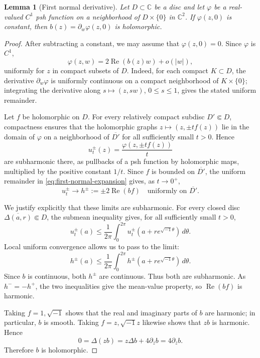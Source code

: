 \documentclass[11pt]{amsart}
\newtheorem{lemma}[theorem]{Lemma}
\theoremstyle{definition}
\theoremstyle{remark}
\numberwithin{equation}{section}
\newcommand{\C}{\mathbb C}
\begin{document}
\begin{lemma}[First normal derivative]\label{lem:first-normal}
Let $D\subset\C$ be a disc and let $\varphi$ be a real-valued
$C^1$ psh function on a neighborhood of $D\times\{0\}$ in
$\C^2$. If $\varphi(z,0)$ is constant, then
$b(z)=\partial_w\varphi(z,0)$ is holomorphic.
\end{lemma}
\begin{proof}
After subtracting a constant, we may assume that $\varphi(z,0)=0$.
Since $\varphi$ is $C^1$,
\begin{equation}\label{eq:first-normal-expansion}
 \varphi(z,w)=2\operatorname{Re}(b(z)w)+o(|w|),
\end{equation}
uniformly for $z$ in compact subsets of $D$. Indeed, for each
compact $K\subset D$, the derivative $\partial_w\varphi$ is
uniformly continuous on a compact neighborhood of $K\times\{0\}$;
integrating the derivative along $s\mapsto(z,sw)$, $0\le s\le1$,
gives the stated uniform remainder.

Let $f$ be holomorphic on $D$. For every relatively compact
subdisc $D'\Subset D$, compactness ensures that the holomorphic
graphs $z\mapsto(z,\pm tf(z))$ lie in the domain of $\varphi$
on a neighborhood of $\overline{D'}$ for all sufficiently small
$t>0$. Hence
\[
 u_t^\pm(z)=\frac{\varphi(z,\pm tf(z))}{t}
\]
are subharmonic there, as pullbacks of a psh function by
holomorphic maps, multiplied by the positive constant $1/t$.
Since $f$ is bounded on $\overline{D'}$, the uniform remainder
in \eqref{eq:first-normal-expansion} gives, as $t\to0^+$,
\[
 u_t^\pm\longrightarrow h^\pm:=\pm2\operatorname{Re}(bf)
 \quad\text{uniformly on }\overline{D'}.
\]

We justify explicitly that these limits are subharmonic.
For every closed disc $\overline{\Delta(a,r)}\Subset D$,
the submean inequality gives, for all sufficiently small $t>0$,
\[
 u_t^\pm(a)\le
 \frac{1}{2\pi}\int_0^{2\pi}
 u_t^\pm(a+re^{\sqrt{-1}\theta})\,d\theta.
\]
Local uniform convergence allows us to pass to the limit:
\[
 h^\pm(a)\le
 \frac{1}{2\pi}\int_0^{2\pi}
 h^\pm(a+re^{\sqrt{-1}\theta})\,d\theta.
\]
Since $b$ is continuous, both $h^\pm$ are continuous.
Thus both are subharmonic. As $h^-=-h^+$, the two inequalities
give the mean-value property, so $\operatorname{Re}(bf)$ is harmonic.

Taking $f=1,\sqrt{-1}$ shows that the real and imaginary parts
of $b$ are harmonic; in particular, $b$ is smooth.
Taking $f=z,\sqrt{-1}z$ likewise shows that $zb$ is harmonic.
Hence
\[
 0=\Delta(zb)=z\Delta b+4\partial_{\bar z}b
   =4\partial_{\bar z}b.
\]
Therefore $b$ is holomorphic.
\end{proof}
\end{document}

